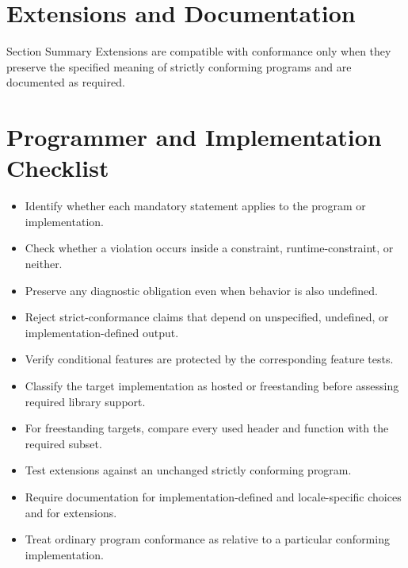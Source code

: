\documentclass[10pt,letterpaper]{article}
\begin{document}
\section{Extensions and Documentation}
\begin{CornellNotesTable}
\end{CornellNotesTable}

\begin{CornellSummaryBox}{Section Summary}
Extensions are compatible with conformance only when they preserve the specified meaning of strictly conforming programs and are documented as required.
\end{CornellSummaryBox}



\section{Programmer and Implementation Checklist}
\begin{itemize}
  \item[$\square$] Identify whether each mandatory statement applies to the program or implementation.
  \item[$\square$] Check whether a violation occurs inside a constraint, runtime-constraint, or neither.
  \item[$\square$] Preserve any diagnostic obligation even when behavior is also undefined.
  \item[$\square$] Reject strict-conformance claims that depend on unspecified, undefined, or implementation-defined output.
  \item[$\square$] Verify conditional features are protected by the corresponding feature tests.
  \item[$\square$] Classify the target implementation as hosted or freestanding before assessing required library support.
  \item[$\square$] For freestanding targets, compare every used header and function with the required subset.
  \item[$\square$] Test extensions against an unchanged strictly conforming program.
  \item[$\square$] Require documentation for implementation-defined and locale-specific choices and for extensions.
  \item[$\square$] Treat ordinary program conformance as relative to a particular conforming implementation.
\end{itemize}
\end{document}
